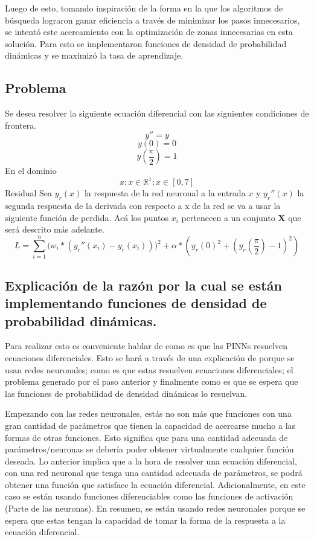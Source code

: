 \documentclass[11pt]{article}
\begin{document}
Luego de esto, tomando inspiración de la forma en la que los algoritmos
de búsqueda lograron ganar eficiencia a través de minimizar los pasos
innecesarios, se intentó este acercamiento con la optimización de zonas
innecesarias en esta solución. Para esto se implementaron funciones de
densidad de probabilidad dinámicas y se maximizó la tasa de aprendizaje.

\hypertarget{problema}{%
\subsection{Problema}\label{problema}}

Se desea resolver la siguiente ecuación diferencial con las siguientes
condiciones de frontera. \[y'' = y\] \[y(0) = 0\]
\[y(\frac{\pi}{2}) = 1\] En el dominio
\[{x : x\in \mathbb{R} ^ 1 :  x\in [0,7]}\] Residual Sea \(y_r(x)\) la
respuesta de la red neuronal a la entrada \(x\) y \(y_r''(x)\) la
segunda respuesta de la derivada con respecto a x de la red se va a usar
la siguiente función de perdida. Acá los puntos \(x_i\) pertenecen a un
conjunto \(\mathbf{X}\) que será descrito más adelante.
\[L = \sum_{i=1}^n{\Big(w_i * (y_r''(x_i)-y_r(x_i))\Big)^2}+\alpha * (y_r(0)^2+(y_r(\frac{\pi}{2}) - 1)^2)\]

\hypertarget{explicaciuxf3n-de-la-razuxf3n-por-la-cual-se-estuxe1n-implementando-funciones-de-densidad-de-probabilidad-dinuxe1micas.}{%
\subsection{Explicación de la razón por la cual se están implementando
funciones de densidad de probabilidad
dinámicas.}\label{explicaciuxf3n-de-la-razuxf3n-por-la-cual-se-estuxe1n-implementando-funciones-de-densidad-de-probabilidad-dinuxe1micas.}}

Para realizar esto es conveniente hablar de como es que las PINNs
resuelven ecuaciones diferenciales. Esto se hará a través de una
explicación de porque se usan redes neuronales; como es que estas
resuelven ecuaciones diferenciales; el problema generado por el paso
anterior y finalmente como es que se espera que las funciones de
probabilidad de densidad dinámicas lo resuelvan.

Empezando con las redes neuronales, estás no son más que funciones con
una gran cantidad de parámetros que tienen la capacidad de acercarse
mucho a las formas de otras funciones. Esto significa que para una
cantidad adecuada de parámetros/neuronas se debería poder obtener
virtualmente cualquier función deseada. Lo anterior implica que a la
hora de resolver una ecuación diferencial, con una red neuronal que
tenga una cantidad adecuada de parámetros, se podrá obtener una función
que satisface la ecuación diferencial. Adicionalmente, en este caso se
están usando funciones diferenciables como las funciones de activación
(Parte de las neuronas). En resumen, se están usando redes neuronales
porque se espera que estas tengan la capacidad de tomar la forma de la
respuesta a la ecuación diferencial.
\end{document}
